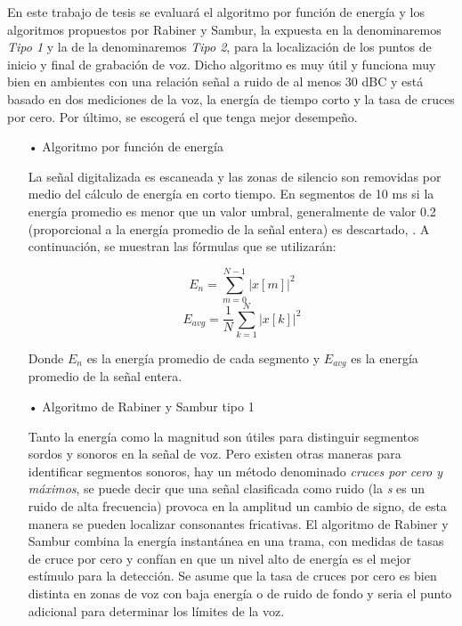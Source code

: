 \begin{enumerate}
En este trabajo de tesis se evaluará el algoritmo por función de energía y los algoritmos propuestos por Rabiner y Sambur, la expuesta en \citep{unam} la denominaremos \textit{Tipo 1} y la de \citep{rabiner} la denominaremos \textit{Tipo 2}, para la localización de los puntos de inicio y final de grabación de voz. Dicho algoritmo es muy útil y funciona muy bien en ambientes con una relación señal a ruido de al menos 30 dBC y está basado en dos mediciones de la voz, la energía de tiempo corto y la tasa de cruces por cero. Por último, se escogerá el que tenga mejor desempeño.

\begin{enumerate}
\item[•]Algoritmo por función de energía
\par
La señal digitalizada es escaneada y las zonas de silencio son removidas por medio del cálculo de energía en corto tiempo. En segmentos de 10 ms si la energía promedio es menor que un valor umbral, generalmente de valor 0.2 (proporcional a la energía promedio de la señal entera) es descartado, \cite{genoveva}. A continuación, se muestran las fórmulas que se utilizarán:

\begin{equation}
\label{eq:ecuacion17}
E_{n} = \sum_{m=0}^{N-1}\left | x[m] \right |^{2}
\end{equation}
\vskip -0.5cm
\begin{equation}
\label{eq:ecuacion18}
E_{avg} = \frac{1}{N}\sum_{k=1}^{N}\left | x[k] \right |^{2}
\end{equation}

Donde $E_{n}$ es la energía promedio de cada segmento y $E_{avg}$ es la energía promedio de la señal entera.

\item[•]Algoritmo de Rabiner y Sambur tipo 1
\par
Tanto la energía como la magnitud son útiles para distinguir segmentos sordos y sonoros en la señal de voz. Pero existen otras maneras para identificar segmentos sonoros, hay un método denominado \textit{cruces por cero y máximos}, se puede decir que una señal clasificada como ruido (la \textit{s} es un ruido de alta frecuencia) provoca en la amplitud un cambio de signo, de esta manera se pueden localizar consonantes fricativas.
\vskip 0.5cm
El algoritmo de Rabiner y Sambur combina la energía instantánea en una trama, con medidas de tasas de cruce por cero y confían en que un nivel alto de energía es el mejor estímulo para la detección. Se asume que la tasa de cruces por cero es bien distinta en zonas de voz con baja energía o de ruido de fondo y seria el punto adicional para determinar los límites de la voz.


\end{enumerate}
\end{enumerate}
